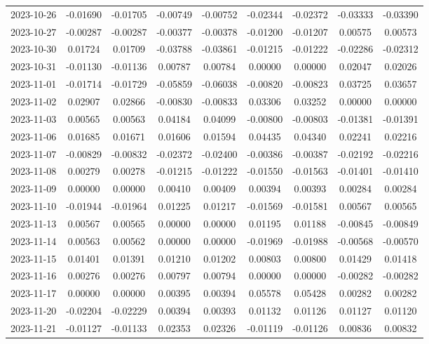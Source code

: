 \begin{footnotesize}
\begin{longtable}{lcccccccc}
2023-10-26 & -0.01690 & -0.01705 & -0.00749 & -0.00752 & -0.02344 & -0.02372 & -0.03333 & -0.03390 \\
2023-10-27 & -0.00287 & -0.00287 & -0.00377 & -0.00378 & -0.01200 & -0.01207 & 0.00575 & 0.00573 \\
2023-10-30 & 0.01724 & 0.01709 & -0.03788 & -0.03861 & -0.01215 & -0.01222 & -0.02286 & -0.02312 \\
2023-10-31 & -0.01130 & -0.01136 & 0.00787 & 0.00784 & 0.00000 & 0.00000 & 0.02047 & 0.02026 \\
2023-11-01 & -0.01714 & -0.01729 & -0.05859 & -0.06038 & -0.00820 & -0.00823 & 0.03725 & 0.03657 \\
2023-11-02 & 0.02907 & 0.02866 & -0.00830 & -0.00833 & 0.03306 & 0.03252 & 0.00000 & 0.00000 \\
2023-11-03 & 0.00565 & 0.00563 & 0.04184 & 0.04099 & -0.00800 & -0.00803 & -0.01381 & -0.01391 \\
2023-11-06 & 0.01685 & 0.01671 & 0.01606 & 0.01594 & 0.04435 & 0.04340 & 0.02241 & 0.02216 \\
2023-11-07 & -0.00829 & -0.00832 & -0.02372 & -0.02400 & -0.00386 & -0.00387 & -0.02192 & -0.02216 \\
2023-11-08 & 0.00279 & 0.00278 & -0.01215 & -0.01222 & -0.01550 & -0.01563 & -0.01401 & -0.01410 \\
2023-11-09 & 0.00000 & 0.00000 & 0.00410 & 0.00409 & 0.00394 & 0.00393 & 0.00284 & 0.00284 \\
2023-11-10 & -0.01944 & -0.01964 & 0.01225 & 0.01217 & -0.01569 & -0.01581 & 0.00567 & 0.00565 \\
2023-11-13 & 0.00567 & 0.00565 & 0.00000 & 0.00000 & 0.01195 & 0.01188 & -0.00845 & -0.00849 \\
2023-11-14 & 0.00563 & 0.00562 & 0.00000 & 0.00000 & -0.01969 & -0.01988 & -0.00568 & -0.00570 \\
2023-11-15 & 0.01401 & 0.01391 & 0.01210 & 0.01202 & 0.00803 & 0.00800 & 0.01429 & 0.01418 \\
2023-11-16 & 0.00276 & 0.00276 & 0.00797 & 0.00794 & 0.00000 & 0.00000 & -0.00282 & -0.00282 \\
2023-11-17 & 0.00000 & 0.00000 & 0.00395 & 0.00394 & 0.05578 & 0.05428 & 0.00282 & 0.00282 \\
2023-11-20 & -0.02204 & -0.02229 & 0.00394 & 0.00393 & 0.01132 & 0.01126 & 0.01127 & 0.01120 \\
2023-11-21 & -0.01127 & -0.01133 & 0.02353 & 0.02326 & -0.01119 & -0.01126 & 0.00836 & 0.00832 \\

\end{longtable}
\end{footnotesize}
